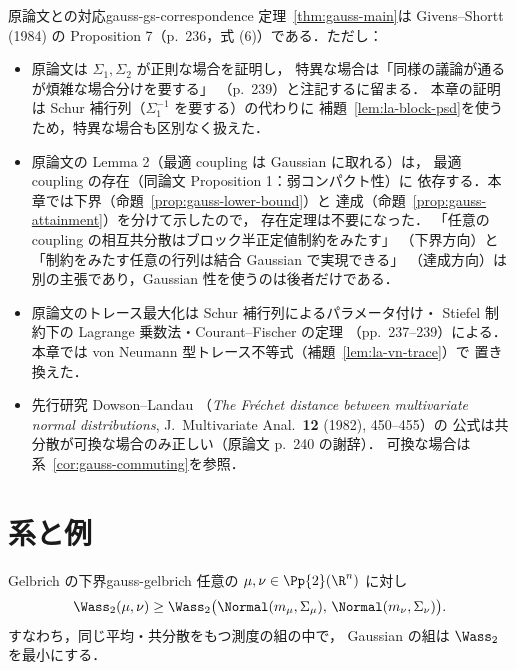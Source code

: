 \begin{remark}{原論文との対応}{gauss-gs-correspondence}
  定理~\ref{thm:gauss-main}は Givens--Shortt (1984) の
  Proposition 7（p.~236，式 (6)）である．ただし：
  \begin{itemize}
    \item 原論文は $\Sigma_1,\Sigma_2$ が正則な場合を証明し，
      特異な場合は「同様の議論が通るが煩雑な場合分けを要する」
      （p.~239）と注記するに留まる．
      本章の証明は Schur 補行列（$\Sigma_1^{-1}$ を要する）の代わりに
      補題~\ref{lem:la-block-psd}を使うため，特異な場合も区別なく扱えた．
    \item 原論文の Lemma 2（最適 coupling は Gaussian に取れる）は，
      最適 coupling の存在（同論文 Proposition 1：弱コンパクト性）に
      依存する．本章では下界（命題~\ref{prop:gauss-lower-bound}）と
      達成（命題~\ref{prop:gauss-attainment}）を分けて示したので，
      存在定理は不要になった．
      「任意の coupling の相互共分散はブロック半正定値制約をみたす」
      （下界方向）と
      「制約をみたす任意の行列は結合 Gaussian で実現できる」
      （達成方向）は別の主張であり，Gaussian 性を使うのは後者だけである．
    \item 原論文のトレース最大化は Schur 補行列によるパラメータ付け・
      Stiefel 制約下の Lagrange 乗数法・Courant--Fischer の定理
      （pp.~237--239）による．
      本章では von Neumann 型トレース不等式（補題~\ref{lem:la-vn-trace}）で
      置き換えた．
    \item 先行研究 Dowson--Landau
      （\emph{The Fréchet distance between multivariate normal
      distributions}, J.\ Multivariate Anal.\ \textbf{12} (1982), 450--455）の
      公式は共分散が可換な場合のみ正しい（原論文 p.~240 の謝辞）．
      可換な場合は系~\ref{cor:gauss-commuting}を参照．
  \end{itemize}
\end{remark}

\section{系と例}
\label{sec:gauss-corollaries}

\begin{corollary}{Gelbrich の下界}{gauss-gelbrich}
  任意の $\mu,\nu\in\Pp{2}(\R^n)$ に対し
  \[
    \Wass_2(\mu,\nu)
    \geq
    \Wass_2\bigl(\Normal(m_\mu,\Sigma_\mu),\,\Normal(m_\nu,\Sigma_\nu)\bigr).
  \]
  すなわち，同じ平均・共分散をもつ測度の組の中で，
  Gaussian の組は $\Wass_2$ を最小にする．
\end{corollary}

